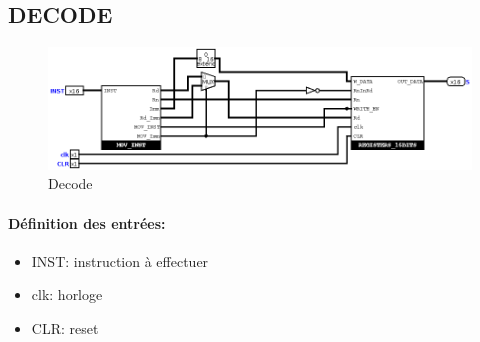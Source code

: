 \documentclass[a4paper]{article} %
\begin{document}
    
\subsection{DECODE}
\begin{figure}[H]
    \centering
    \includegraphics[width=1\textwidth]{src/DECODE.png}
    \caption{Decode}
    \label{decode_img}
\end{figure}

\paragraph{Définition des entrées:}
\begin{itemize}
    \item     INST: instruction à effectuer
    \item     clk: horloge
    \item     CLR: reset
\end{itemize}
\end{document}
